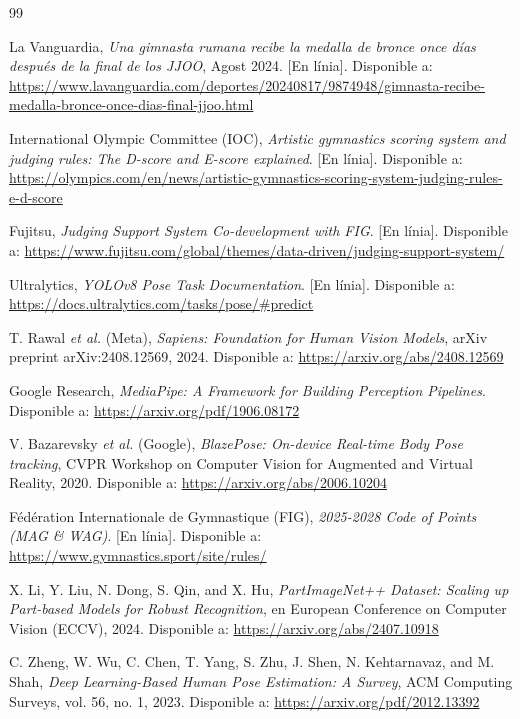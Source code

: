 \documentclass[10pt,a4paper,twocolumn,twoside]{article}
\begin{document}
\begin{thebibliography}{99}

La Vanguardia, \textit{Una gimnasta rumana recibe la medalla de bronce once días después de la final de los JJOO}, Agost 2024. [En línia]. Disponible a: \url{https://www.lavanguardia.com/deportes/20240817/9874948/gimnasta-recibe-medalla-bronce-once-dias-final-jjoo.html}

International Olympic Committee (IOC), \textit{Artistic gymnastics scoring system and judging rules: The D-score and E-score explained}. [En línia]. Disponible a: \url{https://olympics.com/en/news/artistic-gymnastics-scoring-system-judging-rules-e-d-score}

Fujitsu, \textit{Judging Support System Co-development with FIG}. [En línia]. Disponible a: \url{https://www.fujitsu.com/global/themes/data-driven/judging-support-system/}

Ultralytics, \textit{YOLOv8 Pose Task Documentation}. [En línia]. Disponible a: \url{https://docs.ultralytics.com/tasks/pose/#predict}

T. Rawal \textit{et al.} (Meta), \textit{Sapiens: Foundation for Human Vision Models}, arXiv preprint arXiv:2408.12569, 2024. Disponible a: \url{https://arxiv.org/abs/2408.12569}

Google Research, \textit{MediaPipe: A Framework for Building Perception Pipelines}. Disponible a: \url{https://arxiv.org/pdf/1906.08172}

V. Bazarevsky \textit{et al.} (Google), \textit{BlazePose: On-device Real-time Body Pose tracking}, CVPR Workshop on Computer Vision for Augmented and Virtual Reality, 2020. Disponible a: \url{https://arxiv.org/abs/2006.10204}

Fédération Internationale de Gymnastique (FIG), \textit{2025-2028 Code of Points (MAG \& WAG)}. [En línia]. Disponible a: \url{https://www.gymnastics.sport/site/rules/}

X. Li, Y. Liu, N. Dong, S. Qin, and X. Hu, \textit{PartImageNet++ Dataset: Scaling up Part-based Models for Robust Recognition}, en European Conference on Computer Vision (ECCV), 2024. Disponible a: \url{https://arxiv.org/abs/2407.10918}

C. Zheng, W. Wu, C. Chen, T. Yang, S. Zhu, J. Shen, N. Kehtarnavaz, and M. Shah, \textit{Deep Learning-Based Human Pose Estimation: A Survey}, ACM Computing Surveys, vol. 56, no. 1, 2023. Disponible a: \url{https://arxiv.org/pdf/2012.13392}


\end{thebibliography}
\end{document}
